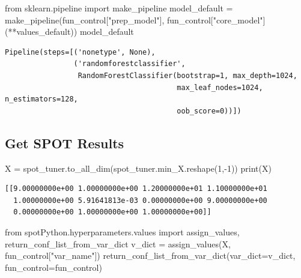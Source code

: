 \documentclass[
  letterpaper,
  DIV=11,
  numbers=noendperiod]{scrreprt}
\newenvironment{Shaded}{\begin{snugshade}}{\end{snugshade}}
\newcommand{\BuiltInTok}[1]{\textcolor[rgb]{0.00,0.23,0.31}{#1}}
\newcommand{\DecValTok}[1]{\textcolor[rgb]{0.68,0.00,0.00}{#1}}
\newcommand{\ImportTok}[1]{\textcolor[rgb]{0.00,0.46,0.62}{#1}}
\newcommand{\NormalTok}[1]{\textcolor[rgb]{0.00,0.23,0.31}{#1}}
\newcommand{\OperatorTok}[1]{\textcolor[rgb]{0.37,0.37,0.37}{#1}}
\newcommand{\StringTok}[1]{\textcolor[rgb]{0.13,0.47,0.30}{#1}}
\begin{document}
\begin{Shaded}
\begin{Highlighting}[]
\ImportTok{from}\NormalTok{ sklearn.pipeline }\ImportTok{import}\NormalTok{ make\_pipeline}
\NormalTok{model\_default }\OperatorTok{=}\NormalTok{ make\_pipeline(fun\_control[}\StringTok{"prep\_model"}\NormalTok{], fun\_control[}\StringTok{"core\_model"}\NormalTok{](}\OperatorTok{**}\NormalTok{values\_default))}
\NormalTok{model\_default}
\end{Highlighting}
\end{Shaded}

\begin{verbatim}
Pipeline(steps=[('nonetype', None),
                ('randomforestclassifier',
                 RandomForestClassifier(bootstrap=1, max_depth=1024,
                                        max_leaf_nodes=1024, n_estimators=128,
                                        oob_score=0))])
\end{verbatim}

\hypertarget{get-spot-results-2}{%
\subsection{Get SPOT Results}\label{get-spot-results-2}}

\begin{Shaded}
\begin{Highlighting}[]
\NormalTok{X }\OperatorTok{=}\NormalTok{ spot\_tuner.to\_all\_dim(spot\_tuner.min\_X.reshape(}\DecValTok{1}\NormalTok{,}\OperatorTok{{-}}\DecValTok{1}\NormalTok{))}
\BuiltInTok{print}\NormalTok{(X)}
\end{Highlighting}
\end{Shaded}

\begin{verbatim}
[[9.00000000e+00 1.00000000e+00 1.20000000e+01 1.10000000e+01
  1.00000000e+00 5.91641813e-03 0.00000000e+00 9.00000000e+00
  0.00000000e+00 1.00000000e+00 1.00000000e+00]]
\end{verbatim}

\begin{Shaded}
\begin{Highlighting}[]
\ImportTok{from}\NormalTok{ spotPython.hyperparameters.values }\ImportTok{import}\NormalTok{ assign\_values, return\_conf\_list\_from\_var\_dict}
\NormalTok{v\_dict }\OperatorTok{=}\NormalTok{ assign\_values(X, fun\_control[}\StringTok{"var\_name"}\NormalTok{])}
\NormalTok{return\_conf\_list\_from\_var\_dict(var\_dict}\OperatorTok{=}\NormalTok{v\_dict, fun\_control}\OperatorTok{=}\NormalTok{fun\_control)}
\end{Highlighting}
\end{Shaded}
\end{document}
